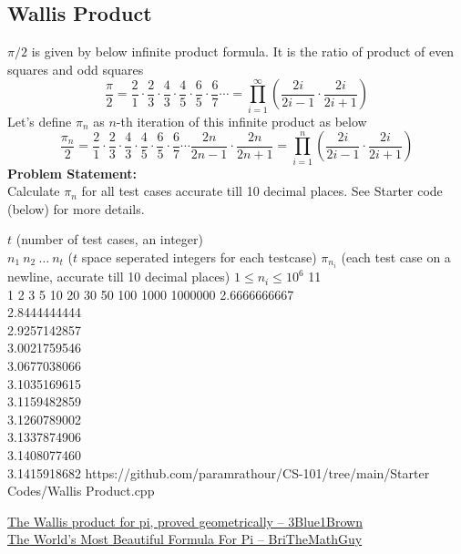 \subsection{Wallis Product}{\label{pp:wallis}}
$\pi/2$ is given by below infinite product formula. It is the ratio of product of even squares and odd squares
\begin{equation}
\frac{\pi}{2} = {\frac {2}{1}}\cdot {\frac {2}{3}}\cdot {\frac {4}{3}}\cdot {\frac {4}{5}}\cdot {\frac {6}{5}}\cdot {\frac {6}{7}}\cdots= \prod _{i=1}^{\infty}\left({\frac {2i}{2i-1}}\cdot {\frac {2i}{2i+1}}\right)
\end{equation}
Let's define $\pi_n$ as $n$-th iteration of this infinite product as below
\begin{equation*}
\frac{\pi_n}{2} = {\frac {2}{1}}\cdot {\frac {2}{3}}\cdot {\frac {4}{3}}\cdot {\frac {4}{5}}\cdot {\frac {6}{5}}\cdot {\frac {6}{7}}\cdots{\frac {2n}{2n-1}}\cdot {\frac {2n}{2n+1}} = \prod _{i=1}^{n}\left({\frac {2i}{2i-1}}\cdot {\frac {2i}{2i+1}}\right)
\end{equation*}
\textbf{Problem Statement:}\\
Calculate $\pi_n$ for all test cases accurate till 10 decimal places. See Starter code (below) for more details.
\begin{testcases}
	{$t$ \hfill(number of test cases, an integer)\\$n_1\ n_2\ \ldots\ n_t$ \hfill($t$ space seperated integers for each testcase)}
	{$\pi_{n_i}$ \hfill(each test case on a newline, accurate till 10 decimal places)}
	{$1 \leq n_i \leq 10^{6}$}
	{11\\1 2 3 5 10 20 30 50 100 1000 1000000}
	{2.6666666667\\2.8444444444\\2.9257142857\\3.0021759546\\3.0677038066\\3.1035169615\\3.1159482859\\3.1260789002\\3.1337874906\\3.1408077460\\3.1415918682}
	{https://github.com/paramrathour/CS-101/tree/main/Starter Codes/Wallis Product.cpp}
\end{testcases}
\begin{funvideo}
\href{https://youtu.be/8GPy_UMV-08}{The Wallis product for pi, proved geometrically -- 3Blue1Brown}\\
\href{https://youtu.be/k9nRlMDbefc}{The World's Most Beautiful Formula For Pi -- BriTheMathGuy}
\end{funvideo}
